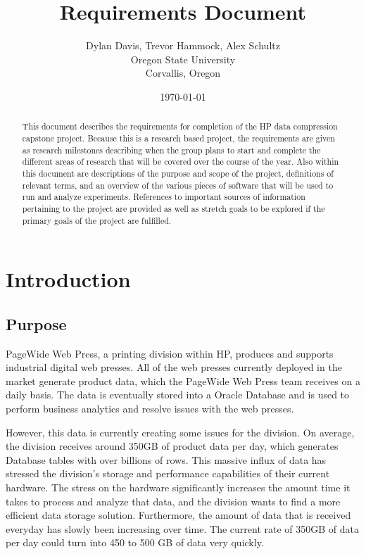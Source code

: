 \documentclass[10pt]{article}
\title{Requirements Document}
\author{
	Dylan Davis, Trevor Hammock, Alex Schultz \\
	Oregon State University\\
	Corvallis, Oregon
}
\date{\today}
\begin{document}
\begin{titlingpage}
\maketitle

\begin{abstract}

This document describes the requirements for completion of the HP data compression capstone project. Because this is a research based project, the requirements are given as research milestones describing when the group plans to start and complete the different areas of research that will be covered over the course of the year. Also within this document are descriptions of the purpose and scope of the project, definitions of relevant terms, and an overview of the various pieces of software that will be used to run and analyze experiments. References to important sources of information pertaining to the project are provided as well as stretch goals to be explored if the primary goals of the project are fulfilled. 

\end{abstract}
\end{titlingpage}


\tableofcontents
\clearpage


\section{Introduction}
\subsection{Purpose}

PageWide Web Press, a printing division within HP, produces and supports industrial digital web presses. All of the web presses currently deployed  in the market generate product data, which the PageWide Web Press team receives on a daily basis. The data is eventually stored into a Oracle Database and is used to perform business analytics and resolve issues with the web presses.

However, this data is currently creating some issues for the division. On average, the division receives around 350GB of product data per day, which generates Database tables with over billions of rows. This massive influx of data has stressed the division's storage and performance capabilities of their current hardware. The stress on the hardware significantly increases the amount time it takes to process and analyze that data, and the division wants to find a more efficient data storage solution. Furthermore, the amount of data that is received everyday has slowly been increasing over time. The current rate of 350GB of data per day could turn into 450 to 500 GB of data very quickly.
\end{document}
